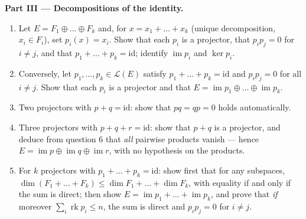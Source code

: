 \begin{problem}
\medskip
\noindent\textbf{Part III --- Decompositions of the identity.}
\begin{enumerate}[resume]
  \item Let $E = F_1 \oplus \dots \oplus F_k$ and, for $x = x_1 +
        \dots + x_k$ (unique decomposition, $x_i \in F_i$), set
        $p_i(x) = x_i$. Show that each $p_i$ is a projector, that
        $p_i p_j = 0$ for $i \neq j$, and that $p_1 + \dots + p_k
        = \mathrm{id}$; identify $\operatorname{im} p_i$ and
        $\ker p_i$.
  \item Conversely, let $p_1, \dots, p_k \in \mathcal{L}(E)$
        satisfy $p_1 + \dots + p_k = \mathrm{id}$ and $p_i p_j =
        0$ for all $i \neq j$. Show that each $p_i$ is a
        projector and that $E = \operatorname{im} p_1 \oplus
        \dots \oplus \operatorname{im} p_k$.
  \item Two projectors with $p + q = \mathrm{id}$: show that $pq
        = qp = 0$ holds automatically.
  \item Three projectors with $p + q + r = \mathrm{id}$: show
        that $p + q$ is a projector, and deduce from question 6
        that \emph{all} pairwise products vanish --- hence $E =
        \operatorname{im} p \oplus \operatorname{im} q \oplus
        \operatorname{im} r$, with no hypothesis on the products.
  \item For $k$ projectors with $p_1 + \dots + p_k =
        \mathrm{id}$: show first that for any subspaces, $\dim
        (F_1 + \dots + F_k) \leq \dim F_1 + \dots + \dim F_k$,
        with equality if and only if the sum is direct; then
        show $E = \operatorname{im} p_1 + \dots +
        \operatorname{im} p_k$, and prove that \emph{if}
        moreover $\sum_i \operatorname{rk} p_i \leq n$, the sum
        is direct and $p_i p_j = 0$ for $i \neq j$.
\end{enumerate}


\end{problem}
